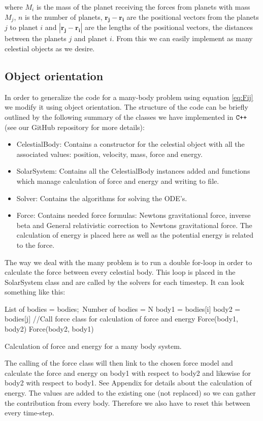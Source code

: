 \documentclass[american,a4paper,12pt]{article}
\renewcommand{\vec}[1]{\mathbf{#1}} %
\begin{document}
where $M_i$ is the mass of the planet receiving the forces from planets with mass $M_j$, $n$ is the number of planets, $\vec{r_j} - \vec{r_i}$ are the positional vectors from the planets $j$ to planet $i$ and $|\vec{r_j} - \vec{r_i}|$ are the lengths of the positional vectors, the distances between the planets $j$ and planet $i$. From this we can easily implement as many celestial objects as we desire. 

\subsection{Object orientation}
In order to generalize the code for a many-body problem using equation \ref{eq:Fij} we modify it using object orientation. The structure of the code can be briefly outlined by the following summary of the classes we have implemented in $\verb!C++!$ (see our GitHub repository \cite{project3} for more details):
\begin{itemize}
    \item CelestialBody: Contains a constructor for the celestial object with all the associated values: position, velocity, mass, force and energy. 
    \item SolarSystem: Contains all the CelestialBody instances added and functions which manage calculation of force and energy and writing to file.
    \item Solver: Contains the algorithms for solving the ODE's.
    \item Force: Contains needed force formulas: Newtons gravitational force, inverse beta and General relativistic correction to Newtons gravitational force. The calculation of energy is placed here as well as the potential energy is related to the force. 
\end{itemize}
The way we deal with the many problem is to run a double for-loop in order to calculate the force between every celestial body. This loop is placed in the SolarSystem class and are called by the solvers for each timestep.
\newpage
It can look something like this: \\
\begin{algorithm}[H]
\SetAlgoLined
List of bodies = bodies;\
Number of bodies = N\;
    {body1 = bodies[i]\;
        {body2 = bodies[j]\;
        //Call force class for calculation of force and energy\;
        Force(body1, body2)\;
        Force(body2, body1)\;
    }
}
 \caption{Calculation of force and energy for a many body system.}
\end{algorithm}
The calling of the force class will then link to the chosen force model and calculate the force and energy on body1 with respect to body2 and likewise for body2 with respect to body1. See Appendix for details about the calculation of energy. The values are added to the existing one (not replaced) so we can gather the contribution from every body. Therefore we also have to reset this between every time-step. 
\end{document}
